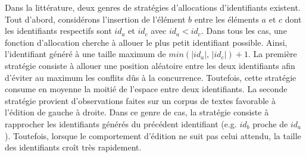 Dans la littérature, deux genres de stratégies d'allocations d'identifiants
existent. Tout d'abord, considérons l'insertion de l'élément $b$ entre les
éléments $a$ et $c$ dont les identifiants respectifs sont $id_a$ et $id_c$ avec
$id_a<id_c$. Dans tous les cas, une fonction d'allocation cherche à allouer le
plus petit identifiant possible. Ainsi, l'identifiant généré à une taille
maximum de $min(|id_a|,\, |id_c|)+1$. La première stratégie consiste à allouer
une position aléatoire entre les deux identifiants afin d'éviter au maximum les
conflits dûs à la concurrence. Toutefois, cette stratégie consume en moyenne la
moitié de l'espace entre deux identifiants. La seconde stratégie provient
d'observations faites sur un corpus de textes favorable à l'édition de gauche à
droite. Dans ce genre de cas, la stratégie consiste à rapprocher les
identifiants générés du précédent identifiant (e.g. $id_b$ proche de
$id_a$). Toutefois, lorsque le comportement d'édition ne suit pas celui attendu,
la taille des identifiants croît très rapidement.

